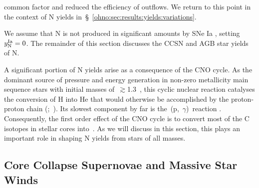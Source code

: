 common factor and reduced the efficiency of outflows.
We return to this point in the context of N yields
in~\S~\ref{ohno:sec:results:yields:variations}.
\par
We assume that N is not produced in significant amounts by SNe Ia
\citep{Johnson2019}, setting~$y_\text{N}^\text{Ia} = 0$.
The remainder of this section discusses the CCSN and AGB star yields of N.
\par
A significant portion of N yields arise as a consequence of the CNO
cycle.
As the dominant source of pressure and energy generation in non-zero
metallicity main sequence stars with initial masses of~$\gtrsim$1.3~\msun, this
cyclic nuclear reaction catalyses the conversion of H into He that would
otherwise be accomplished by the proton-proton chain
(\citealp{vonWeizsaecker1937, vonWeizsaecker1938, Bethe1939a, Bethe1939b,
Adelberger2011};~\citealp*{Suliga2021}).
Its slowest component by far is the~\Nfourteen(p,~$\gamma$)\Ofifteen~reaction
\citep[e.g.][]{LUNACollaboration2006}.
Consequently, the first order effect of the CNO cycle is to convert most of the
C isotopes in stellar cores into~\Nfourteen.
As we will discuss in this section, this plays an important role in shaping N
yields from stars of all masses.

\subsection{Core Collapse Supernovae and Massive Star Winds}
\label{ohno:sec:yields:ccsne}

